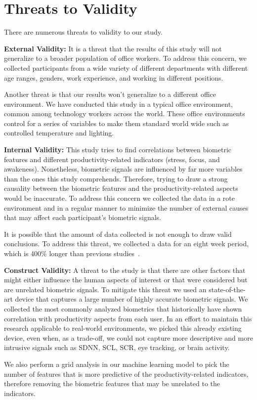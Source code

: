 \section{Threats to Validity}
There are numerous threats to validity to our study.

\textbf{External Validity:}
It is a threat that the results of this study
will not generalize to a broader population of office workers.
To address this concern, we collected participants
from a wide variety of different departments
with different age ranges, genders, work experience, and 
working in different positions.

Another threat is that our results won't generalize
to a different office environment. We have conducted
this study in a typical office environment, common
among technology workers across the world.
These office environments control for a series of
variables to make them standard world wide such
as controlled temperature and lighting.

\textbf{Internal Validity:}
This study tries to find correlations between
biometric features and different productivity-related indicators (stress, focus, and awakeness).
Nonetheless, biometric signals are influenced by far more
variables than the ones this study comprehends.
Therefore, trying to draw a strong causality between the biometric
features and the productivity-related aspects would be inaccurate.
To address this concern we collected the data
in a rote environment and in a regular manner 
to minimize the number of 
external causes that may affect each participant's
biometric signals.

It is possible that the amount of data collected
is not enough
to draw valid conclusions. To address this threat, 
we collected a data for an eight week period, which is
400\% longer than previous studies~\cite{zuger18,Muller16}.


\textbf{Construct Validity:}
A threat to the study is that
there are other factors that might either influence the
human aspects of interest or that were considered but
are unrelated biometric signals.
To mitigate this threat we used an state-of-the-art
device that captures a large number of highly accurate biometric
signals. We collected the most commonly analyzed
biometrics that historically have shown correlation with 
productivity aspects from each user.
In an effort to maintain this research applicable to real-world environments, we picked this already existing device, even when, as a trade-off, we could not capture more descriptive and more intrusive signals such as SDNN, SCL, SCR, eye tracking, or brain activity.

We also perform a grid analysis in our machine learning model
to pick the number of features that is more predictive
of the productivity-related indicators, 
therefore removing the biometric
features that may be unrelated to the indicators.











